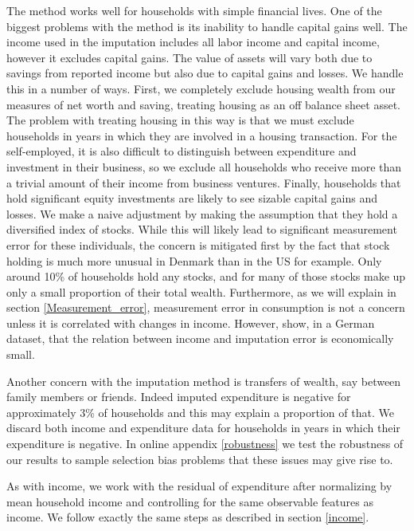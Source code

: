 \documentclass[titlepage]{\econtex}\newcommand{\texname}{ConsumptionHeterogeneity}
\begin{document}
The method works well for households with simple financial lives. One of the biggest problems with the method is its inability to handle capital gains well. The income used in the imputation includes all labor income and capital income, however it excludes capital gains. The value of assets will vary both due to savings from reported income but also due to capital gains and losses. We handle this in a number of ways. First, we completely exclude housing wealth from our measures of net worth and saving, treating housing as an off balance sheet asset. The problem with treating housing in this way is that we must exclude households in years in which they are involved in a housing transaction. For the self-employed, it is also difficult to distinguish between expenditure and investment in their business, so we exclude all households who receive more than a trivial amount of their income from business ventures. Finally, households that hold significant equity investments are likely to see sizable capital gains and losses. We make a naive adjustment by making the assumption that they hold a diversified index of stocks. While this will likely lead to significant measurement error for these individuals, the concern is mitigated first by the fact that stock holding is much more unusual in Denmark than in the US for example. Only around 10\% of households hold any stocks, and for many of those stocks make up only a small proportion of their total wealth. Furthermore, as we will explain in section \ref{Measurement_error}, measurement error in consumption is not a concern unless it is correlated with changes in income. However, \cite{baker_measurement_2018} show, in a German dataset, that the relation between income and imputation error is economically small. 

Another concern with the imputation method is transfers of wealth, say between family members or friends. Indeed imputed expenditure is negative for approximately 3\% of households and this may explain a proportion of that. We discard both income and expenditure data for households in years in which their expenditure is negative. In online appendix \ref{robustness} we test the robustness of our results to sample selection bias problems that these issues may give rise to.

As with income, we work with the residual of expenditure after normalizing by mean household income and controlling for the same observable features as income. We follow exactly the same steps as described in section \ref{income}.
\end{document}
